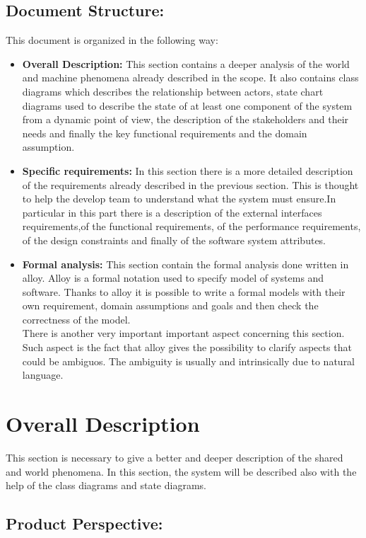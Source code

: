 \documentclass[titlepage]{article}
\begin{document}
\subsection{Document Structure: }
This document is organized in the following way:
\begin{itemize}
	\item \textbf{Overall Description:} This section contains a deeper analysis of the world and machine phenomena already described in the scope. It also contains class diagrams which describes the relationship between actors, state chart diagrams used to describe the state of at least one component of the system from a dynamic point of view, the description of the stakeholders and their needs and finally the key functional requirements and the domain assumption.
	
	\item \textbf{Specific requirements:} In this section there is a more detailed description of the requirements already described in the previous section. This is thought to help the develop team to understand what the system must ensure.In particular in this part there is a description of the external interfaces requirements,of the functional requirements, of the performance requirements, of the design constraints and finally of the software system attributes.
	
	\item \textbf{Formal analysis:} This section contain the formal analysis done written in alloy. Alloy is a formal notation used to specify model of systems and software. Thanks to alloy it is possible to write a formal models with their own requirement, domain assumptions and goals and then check the correctness of the model.\\
There is another very important important aspect concerning this section. Such aspect is the fact that alloy gives the possibility to clarify aspects that could be ambiguos. The ambiguity is usually and intrinsically due to natural language. 
\end{itemize}
\newpage

\section{Overall Description}
This section is necessary to give a better and deeper description of the shared and world phenomena. In this section, the system will be described also with the help of the class diagrams and state diagrams.
\subsection{Product Perspective:}
\end{document}
